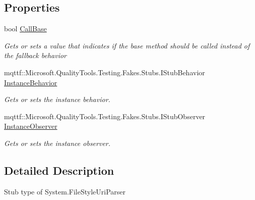 \subsection*{Properties}
\begin{DoxyCompactItemize}
\item 
bool \hyperlink{class_system_1_1_fakes_1_1_stub_file_style_uri_parser_a7adc589322c1be04a80e6ef761355bd3}{Call\-Base}
\begin{DoxyCompactList}\small\item\em Gets or sets a value that indicates if the base method should be called instead of the fallback behavior\end{DoxyCompactList}\item 
mqttf\-::\-Microsoft.\-Quality\-Tools.\-Testing.\-Fakes.\-Stubs.\-I\-Stub\-Behavior \hyperlink{class_system_1_1_fakes_1_1_stub_file_style_uri_parser_a5045a8c3b72c68a4ad589817c6a3d19b}{Instance\-Behavior}
\begin{DoxyCompactList}\small\item\em Gets or sets the instance behavior.\end{DoxyCompactList}\item 
mqttf\-::\-Microsoft.\-Quality\-Tools.\-Testing.\-Fakes.\-Stubs.\-I\-Stub\-Observer \hyperlink{class_system_1_1_fakes_1_1_stub_file_style_uri_parser_aa7fa6f92923ef5d418e7c029ea017c4e}{Instance\-Observer}
\begin{DoxyCompactList}\small\item\em Gets or sets the instance observer.\end{DoxyCompactList}\end{DoxyCompactItemize}


\subsection{Detailed Description}
Stub type of System.\-File\-Style\-Uri\-Parser



